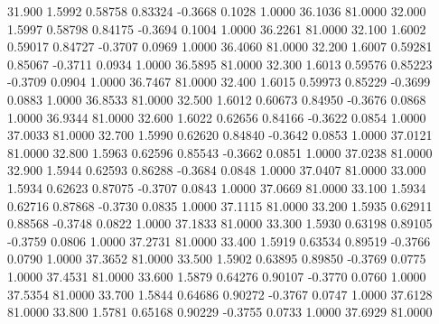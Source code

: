   31.900   1.5992   0.58758   0.83324  -0.3668   0.1028   1.0000  36.1036  81.0000
  32.000   1.5997   0.58798   0.84175  -0.3694   0.1004   1.0000  36.2261  81.0000
  32.100   1.6002   0.59017   0.84727  -0.3707   0.0969   1.0000  36.4060  81.0000
  32.200   1.6007   0.59281   0.85067  -0.3711   0.0934   1.0000  36.5895  81.0000
  32.300   1.6013   0.59576   0.85223  -0.3709   0.0904   1.0000  36.7467  81.0000
  32.400   1.6015   0.59973   0.85229  -0.3699   0.0883   1.0000  36.8533  81.0000
  32.500   1.6012   0.60673   0.84950  -0.3676   0.0868   1.0000  36.9344  81.0000
  32.600   1.6022   0.62656   0.84166  -0.3622   0.0854   1.0000  37.0033  81.0000
  32.700   1.5990   0.62620   0.84840  -0.3642   0.0853   1.0000  37.0121  81.0000
  32.800   1.5963   0.62596   0.85543  -0.3662   0.0851   1.0000  37.0238  81.0000
  32.900   1.5944   0.62593   0.86288  -0.3684   0.0848   1.0000  37.0407  81.0000
  33.000   1.5934   0.62623   0.87075  -0.3707   0.0843   1.0000  37.0669  81.0000
  33.100   1.5934   0.62716   0.87868  -0.3730   0.0835   1.0000  37.1115  81.0000
  33.200   1.5935   0.62911   0.88568  -0.3748   0.0822   1.0000  37.1833  81.0000
  33.300   1.5930   0.63198   0.89105  -0.3759   0.0806   1.0000  37.2731  81.0000
  33.400   1.5919   0.63534   0.89519  -0.3766   0.0790   1.0000  37.3652  81.0000
  33.500   1.5902   0.63895   0.89850  -0.3769   0.0775   1.0000  37.4531  81.0000
  33.600   1.5879   0.64276   0.90107  -0.3770   0.0760   1.0000  37.5354  81.0000
  33.700   1.5844   0.64686   0.90272  -0.3767   0.0747   1.0000  37.6128  81.0000
  33.800   1.5781   0.65168   0.90229  -0.3755   0.0733   1.0000  37.6929  81.0000
